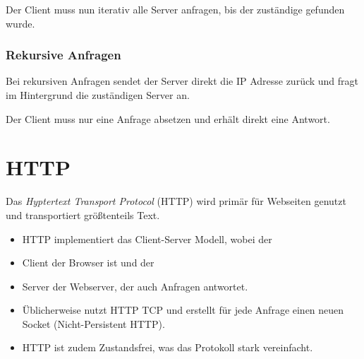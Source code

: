 \documentclass[a4paper, 11pt, accentcolor = tud3b]{tudreport}
\begin{document}
	                Der Client muss nun iterativ alle Server anfragen, bis der zuständige gefunden wurde.
                
                \subsubsection{Rekursive Anfragen}
	                Bei rekursiven Anfragen sendet der Server direkt die IP Adresse zurück und fragt im Hintergrund die zuständigen Server an.
	                
	                Der Client muss nur eine Anfrage absetzen und erhält direkt eine Antwort.

        \section{HTTP} %
            Das \textit{Hyptertext Transport Protocol} (HTTP) wird primär für Webseiten genutzt und transportiert größtenteils Text.
            
	        \begin{itemize}
	        	\item HTTP implementiert das Client-Server Modell, wobei der
	        	\item Client der Browser ist und der
	        	\item Server der Webserver, der auch Anfragen antwortet.
	        	\item Üblicherweise nutzt HTTP TCP und erstellt für jede Anfrage einen neuen Socket (Nicht-Persistent HTTP).
	        	\item HTTP ist zudem Zustandsfrei, was das Protokoll stark vereinfacht.
	        \end{itemize}
\end{document}
